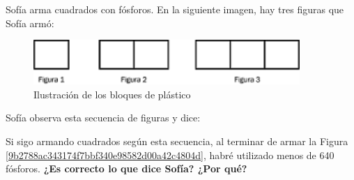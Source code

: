\question[10] Sofía arma cuadrados con fósforos. En la siguiente imagen, hay tres figuras que Sofía armó:

\begin{minipage}{0.4\linewidth}
    \begin{figure}[H]
        \centering
        \includegraphics[width=0.9\textwidth]{../images/9b2788ac343174f7bbf340e98582d00a42c4804d}
        \caption{Ilustración de los bloques de plástico}
        \label{fig:9b2788ac343174f7bbf340e98582d00a42c4804d}
    \end{figure}
\end{minipage}\hfill
\begin{minipage}{0.6\linewidth}
    Sofía observa esta secuencia de figuras y dice:

    Si sigo armando cuadrados según esta secuencia, al terminar de armar la Figura \ref{9b2788ac343174f7bbf340e98582d00a42c4804d}, habré utilizado menos de 640 fósforos.
    \textbf{¿Es correcto lo que dice Sofía? ¿Por qué?}
\end{minipage}


